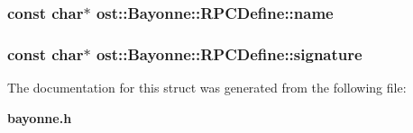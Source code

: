 \subsubsection[{name}]{\setlength{\rightskip}{0pt plus 5cm}const char$\ast$ {\bf ost::Bayonne::RPCDefine::name}}\label{structost_1_1_bayonne_1_1_r_p_c_define_a3955016a3e372de841b46616ea132067}
\subsubsection[{signature}]{\setlength{\rightskip}{0pt plus 5cm}const char$\ast$ {\bf ost::Bayonne::RPCDefine::signature}}\label{structost_1_1_bayonne_1_1_r_p_c_define_ab7f37dec14a88fc446ac96183bb084cb}


The documentation for this struct was generated from the following file:\begin{DoxyCompactItemize}
\item 
{\bf bayonne.h}\end{DoxyCompactItemize}
